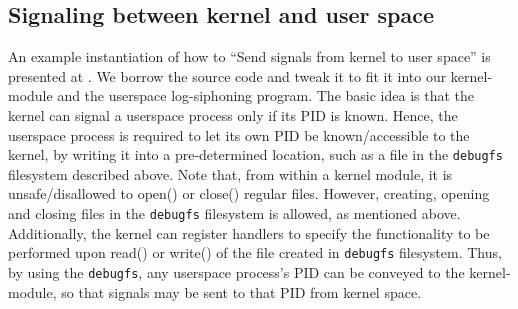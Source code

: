 \subsection{Signaling between kernel and user space}
An example instantiation of how to ``Send signals from kernel to user space'' 
is presented at \cite{kernel-signaling}. We borrow the source code and
tweak it to fit it into our kernel-module and the userspace log-siphoning
program. The basic idea is that the kernel can signal a userspace process
only if its PID is known. Hence, the userspace process is required to 
let its own PID be known/accessible to the kernel, by writing it into a
pre-determined location, such as a file in the \texttt{debugfs} filesystem
described above. Note that, from within a kernel module, it is 
unsafe/disallowed to open() or close() regular files. However, creating,
opening and closing files in the \texttt{debugfs} filesystem is allowed,
as mentioned above. Additionally, the kernel can register handlers to 
specify the functionality to be performed upon read() or write() of
the file created in \texttt{debugfs} filesystem. Thus, by using the
\texttt{debugfs}, any userspace process's PID can be conveyed to the
kernel-module, so that signals may be sent to that PID from kernel space.
